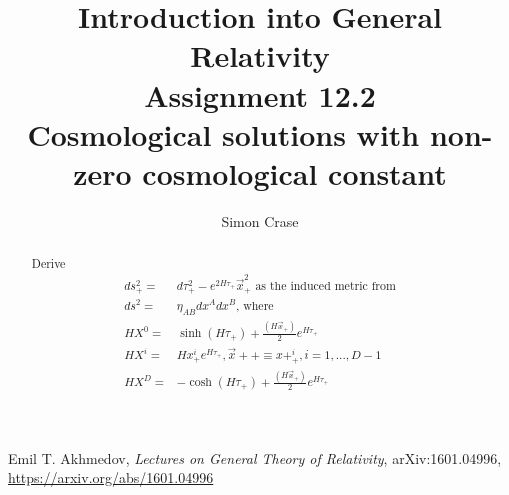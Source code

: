 \documentclass[]{article}
\title{Introduction into General Relativity\\Assignment 12.2\\Cosmological solutions with non-zero cosmological constant}
\author{Simon Crase}
\begin{document}
\maketitle

\begin{abstract}
Derive 
\begin{align*}
ds^2_+=&d\tau^2_+ - e^{2H\tau_+}\vec{x}^2_+\text{ as the induced metric from}\\
ds^2=&\eta_{AB}dx^Adx^B\text{, where}\\
HX^0=&\sinh(H\tau_+)+\frac{(H\vec{x}_+)}{2}e^{H\tau_+}\\
HX^i=&Hx^i_+e^{H\tau_+}, \vec{x}++\equiv x+^i_+, i=1,...,D-1\\
HX^D=&-\cosh(H\tau_+)+\frac{(H\vec{x}_+)}{2}e^{H\tau_+}
\end{align*}
\end{abstract}

\section{}

\begin{thebibliography}{9}\label{section:biblio}
	\raggedright
	Emil T. Akhmedov,
	\emph{Lectures on General Theory of Relativity},
	arXiv:1601.04996,
	\url{https://arxiv.org/abs/1601.04996}
\end{thebibliography}
\end{document}
